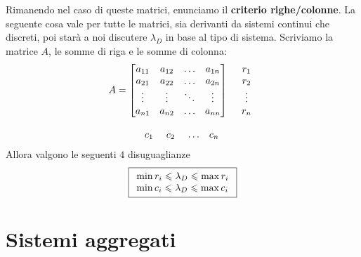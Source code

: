 \documentclass[10pt,a4paper]{book}
\begin{document}
Rimanendo nel caso di queste matrici, enunciamo il \textbf{criterio righe/colonne}. La seguente cosa vale per tutte le matrici, sia derivanti da sistemi continui che discreti, poi starà a noi discutere $\lambda _D$ in base al tipo di sistema. Scriviamo la matrice $A$, le somme di riga e le somme di colonna:
\begin{equation*}
	\begin{array}{ r l }
		A=\begin{bmatrix}
		a_{11} & a_{12} & \dotsc & a_{1n} \\
		a_{21} & a_{22} & \dotsc & a_{2n} \\
		\vdots & \vdots & \ddots & \vdots \\
		a_{n1} & a_{n2} & \dotsc & a_{nn} 
		\end{bmatrix} & \begin{array}{ c }
		r_1\\
		r_2\\
		\vdots \\
		r_n
	\end{array}\\
	& \\
	\begin{array}{ c c c c }
		c_{1\ } & c_{2\ } & \dotsc & c_{n\ } 
	\end{array} & 
	\end{array}
\end{equation*}
Allora valgono le seguenti $4$ disuguaglianze
\begin{equation*}
	\boxed{
		\begin{array}{{>{\displaystyle}l}}
			\min r_i \leqslant \lambda _D \leqslant \max r_i \\
			\min c_i \leqslant \lambda _D \leqslant \max c_i 
		\end{array}
	}
\end{equation*}
\chapter{Sistemi aggregati}
\end{document}
